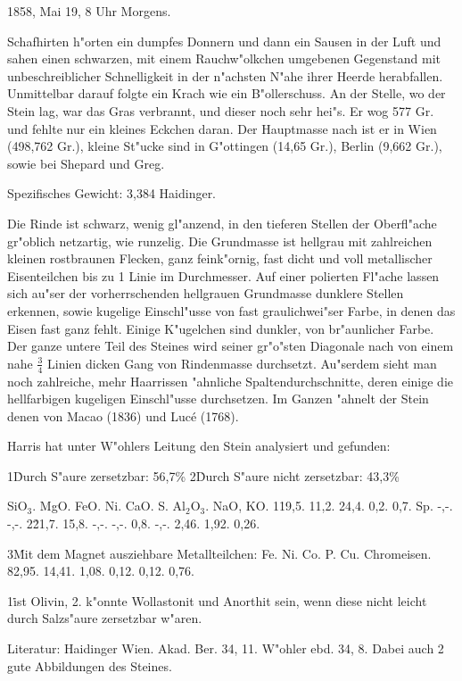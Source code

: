 \documentclass[a4paper, 11pt, oneside]{article}
\begin{document}
1858, Mai 19, 8 Uhr Morgens.

Schafhirten h"orten ein dumpfes Donnern und dann ein Sausen in der Luft und sahen einen schwarzen, mit einem Rauchw"olkchen umgebenen Gegenstand mit unbeschreiblicher Schnelligkeit in der n"achsten N"ahe ihrer Heerde herabfallen. Unmittelbar darauf folgte ein Krach wie ein B"ollerschuss. An der Stelle, wo der Stein lag, war das Gras verbrannt, und dieser noch sehr hei"s. Er wog 577 Gr. und fehlte nur ein kleines Eckchen daran. Der Hauptmasse nach ist er in Wien (498,762 Gr.), kleine St"ucke sind in G"ottingen (14,65 Gr.), Berlin (9,662 Gr.), sowie bei Shepard und Greg.

Spezifisches Gewicht: 3,384 Haidinger.

Die Rinde ist schwarz, wenig gl"anzend, in den tieferen Stellen der Oberfl"ache gr"oblich netzartig, wie runzelig. Die Grundmasse ist hellgrau mit zahlreichen kleinen rostbraunen Flecken, ganz feink"ornig, fast dicht und voll metallischer Eisenteilchen bis zu 1 Linie im Durchmesser. Auf einer polierten Fl"ache lassen sich au"ser der vorherrschenden hellgrauen Grundmasse dunklere Stellen erkennen, sowie kugelige Einschl"usse von fast graulichwei"ser Farbe, in denen das Eisen fast ganz fehlt. Einige K"ugelchen sind dunkler, von br"aunlicher Farbe. Der ganze untere Teil des Steines wird seiner gr"o"sten Diagonale nach von einem nahe $\frac{3}{4}$ Linien dicken Gang von Rindenmasse durchsetzt. Au"serdem sieht man noch zahlreiche, mehr Haarrissen "ahnliche Spaltendurchschnitte, deren einige die hellfarbigen kugeligen Einschl"usse durchsetzen. Im Ganzen "ahnelt der Stein denen von Macao (1836) und Lucé (1768).

Harris hat unter W"ohlers Leitung den Stein analysiert und gefunden:

1\. Durch S"aure zersetzbar: 56,7\%  
2\. Durch S"aure nicht zersetzbar: 43,3\%

SiO$_{3}$. MgO. FeO. Ni. CaO. S. Al$_{2}$O$_{3}$. NaO, KO.  
1\. 19,5. 11,2. 24,4. 0,2. 0,7. Sp. -,-. -,-.  
2\. 21,7. 15,8. -,-. -,-. 0,8. -,-. 2,46. 1,92. 0,26.

3\. Mit dem Magnet ausziehbare Metallteilchen:  
Fe. Ni. Co. P. Cu. Chromeisen.  
82,95. 14,41. 1,08. 0,12. 0,12. 0,76.

1\. ist Olivin, 2. k"onnte Wollastonit und Anorthit sein, wenn diese nicht leicht durch Salzs"aure zersetzbar w"aren.

Literatur: Haidinger Wien. Akad. Ber. 34, 11. W"ohler ebd. 34, 8. Dabei auch 2 gute Abbildungen des Steines.
\end{document}
